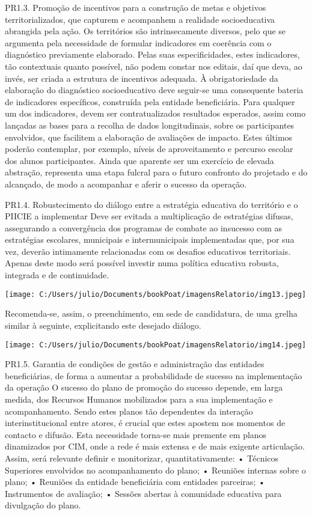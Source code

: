 \documentclass[
]{book}
\begin{document}
PR1.3. Promoção de incentivos para a construção de metas e objetivos territorializados, que capturem e acompanhem a realidade socioeducativa abrangida pela ação.
Os territórios são intrinsecamente diversos, pelo que se argumenta pela necessidade de formular indicadores em coerência com o diagnóstico previamente elaborado. Pelas suas especificidades, estes indicadores, tão contextuais quanto possível, não podem constar nos editais, daí que deva, ao invés, ser criada a estrutura de incentivos adequada. À obrigatoriedade da elaboração do diagnóstico socioeducativo deve seguir-se uma consequente bateria de indicadores específicos, construída pela entidade beneficiária.
Para qualquer um dos indicadores, devem ser contratualizados resultados esperados, assim como lançadas as bases para a recolha de dados longitudinais, sobre os participantes envolvidos, que facilitem a elaboração de avaliações de impacto. Estes últimos poderão contemplar, por exemplo, níveis de aproveitamento e percurso escolar dos alunos participantes. Ainda que aparente ser um exercício de elevada abstração, representa uma etapa fulcral para o futuro confronto do projetado e do alcançado, de modo a acompanhar e aferir o sucesso da operação.

PR1.4. Robustecimento do diálogo entre a estratégia educativa do território e o PIICIE a implementar
Deve ser evitada a multiplicação de estratégias difusas, assegurando a convergência dos programas de combate ao insucesso com as estratégias escolares, municipais e intermunicipais implementadas que, por sua vez, deverão intimamente relacionadas com os desafios educativos territoriais. Apenas deste modo será possível investir numa política educativa robusta, integrada e de continuidade.

\texttt{[image: C:/Users/julio/Documents/bookPoat/imagensRelatorio/img13.jpeg]}

Recomenda-se, assim, o preenchimento, em sede de candidatura, de uma grelha similar à seguinte, explicitando este desejado diálogo.

\texttt{[image: C:/Users/julio/Documents/bookPoat/imagensRelatorio/img14.jpeg]}

PR1.5. Garantia de condições de gestão e administração das entidades beneficiárias, de forma a aumentar a probabilidade de sucesso na implementação da operação
O sucesso do plano de promoção do sucesso depende, em larga medida, dos Recursos Humanos mobilizados para a sua implementação e acompanhamento. Sendo estes planos tão dependentes da interação interinstitucional entre atores, é crucial que estes apostem nos momentos de contacto e difusão. Esta necessidade torna-se mais premente em planos dinamizados por CIM, onde a rede é mais extensa e de mais exigente articulação.\\
Assim, será relevante definir e monitorizar, quantitativamente:
• Técnicos Superiores envolvidos no acompanhamento do plano;
• Reuniões internas sobre o plano;
• Reuniões da entidade beneficiária com entidades parceiras;
• Instrumentos de avaliação;
• Sessões abertas à comunidade educativa para divulgação do plano.
\end{document}
